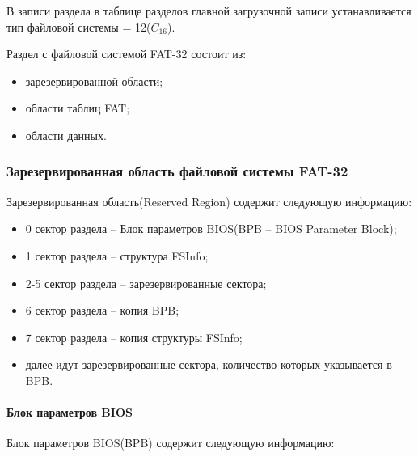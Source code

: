 В записи раздела в таблице разделов главной загрузочной записи устанавливается тип файловой системы = 12($C_{16}$).

Раздел с файловой системой FAT-32 состоит из:

\begin{itemize}
\item зарезервированной области;
\item области таблиц FAT;
\item области данных.
\end{itemize}

\subsubsection{Зарезервированная область файловой системы FAT-32}

Зарезервированная область(Reserved Region) содержит следующую информацию:

\begin{itemize}
\item 0 сектор раздела -- Блок параметров BIOS(BPB -- BIOS Parameter Block);
\item 1 сектор раздела -- структура FSInfo;
\item 2-5 сектор раздела -- зарезервированные сектора;
\item 6 сектор раздела -- копия BPB;
\item 7 сектор раздела -- копия структуры FSInfo;
\item далее идут зарезервированные сектора, количество которых указывается в BPB.
\end{itemize}

\paragraph{Блок параметров BIOS}

Блок параметров BIOS(BPB) содержит следующую информацию:

